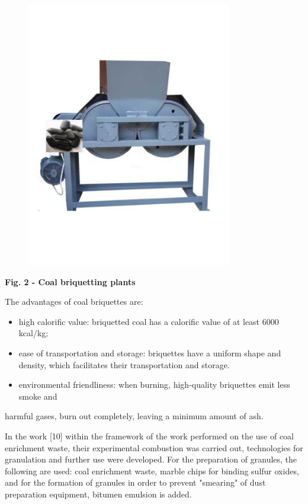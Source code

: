 \begin{figure}[H]
	\centering
	\includegraphics[width=0.8\textwidth]{media/gorn2/image3}
	\caption*{}
\end{figure}


{\bfseries Fig. 2 - Coal briquetting plants}

The advantages of coal briquettes are:

\begin{itemize}
\item
  high calorific value: briquetted coal has a calorific value of at
  least 6000 kcal/kg;
\item
  ease of transportation and storage: briquettes have a uniform shape
  and density, which facilitates their transportation and storage.
\item
  environmental friendliness: when burning, high-quality briquettes emit
  less smoke and
\end{itemize}

harmful gases, burn out completely, leaving a minimum amount of ash.

In the work {[}10{]} within the framework of the work performed on the
use of coal enrichment waste, their experimental combustion was carried
out, technologies for granulation and further use were developed. For
the preparation of granules, the following are used: coal enrichment
waste, marble chips for binding sulfur oxides, and for the formation of
granules in order to prevent "smearing" of dust preparation equipment,
bitumen emulsion is added.

